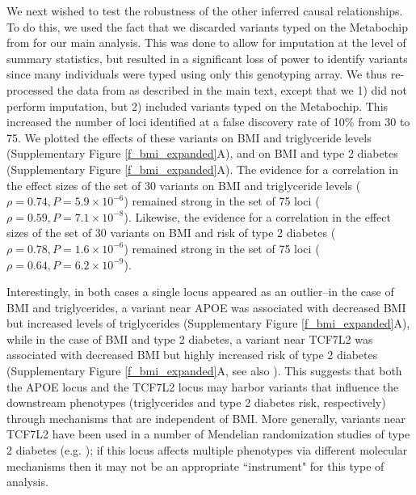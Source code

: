 \documentclass[11pt,titlepage]{article}
\begin{document}
We next wished to test the robustness of the other inferred causal relationships. To do this, we used the fact that we discarded variants typed on the Metabochip from \citet{Locke:2015aa} for our main analysis. This was done to allow for imputation at the level of summary statistics, but resulted in a significant loss of power to identify variants since many individuals were typed using only this genotyping array. We thus re-processed the data from \citet{Locke:2015aa} as described in the main text, except that we 1) did not perform imputation, but 2) included variants typed on the Metabochip. This increased the number of loci identified at a false discovery rate of 10\% from 30 to 75. We plotted the effects of these variants on BMI and triglyceride levels (Supplementary Figure \ref{f_bmi_expanded}A), and on BMI and type 2 diabetes (Supplementary Figure \ref{f_bmi_expanded}A). The evidence for a correlation in the effect sizes of the set of 30 variants on BMI and triglyceride levels ($\rho =  0.74, P = 5.9 \times 10^{-6}$) remained strong in the set of 75 loci ($\rho = 0.59, P = 7.1 \times 10^{-8}$). Likewise, the evidence for a correlation in the effect sizes of the set of 30 variants on BMI and risk of type 2 diabetes ($\rho = 0.78, P = 1.6 \times 10^{-6}$) remained strong in the set of 75 loci ($\rho = 0.64, P = 6.2 \times 10^{-9}$). 

Interestingly, in both cases a single locus appeared as an outlier--in the case of BMI and triglycerides, a variant near APOE was associated with decreased BMI but increased levels of triglycerides (Supplementary Figure \ref{f_bmi_expanded}A), while in the case of BMI and type 2 diabetes, a variant near TCF7L2 was associated with decreased BMI but highly increased risk of type 2 diabetes (Supplementary Figure \ref{f_bmi_expanded}A, see also \citet{Helgason:2007aa}). This suggests that both the APOE locus and the TCF7L2 locus may harbor variants that influence the downstream phenotypes (triglycerides and type 2 diabetes risk, respectively) through mechanisms that are independent of BMI. More generally, variants near TCF7L2 have been used in a number of Mendelian randomization studies of type 2 diabetes (e.g. \cite{Song:2012aa, Villareal:2010aa, Pfister:2011aa}); if this locus affects multiple phenotypes via different molecular mechanisms then it may not be an appropriate ``instrument" for this type of analysis. 
\end{document}
